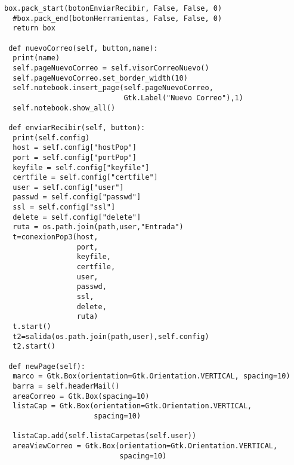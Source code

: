 \begin{lstlisting}[frame=single]
  box.pack_start(botonEnviarRecibir, False, False, 0)
  #box.pack_end(botonHerramientas, False, False, 0)
  return box

 def nuevoCorreo(self, button,name):
  print(name)
  self.pageNuevoCorreo = self.visorCorreoNuevo()
  self.pageNuevoCorreo.set_border_width(10)
  self.notebook.insert_page(self.pageNuevoCorreo, 
                            Gtk.Label("Nuevo Correo"),1)
  self.notebook.show_all()

 def enviarRecibir(self, button):
  print(self.config)
  host = self.config["hostPop"]
  port = self.config["portPop"]
  keyfile = self.config["keyfile"]
  certfile = self.config["certfile"]
  user = self.config["user"]
  passwd = self.config["passwd"]
  ssl = self.config["ssl"]
  delete = self.config["delete"]
  ruta = os.path.join(path,user,"Entrada")
  t=conexionPop3(host, 
                 port, 
                 keyfile, 
                 certfile, 
                 user, 
                 passwd, 
                 ssl, 
                 delete, 
                 ruta)
  t.start()
  t2=salida(os.path.join(path,user),self.config)
  t2.start()

 def newPage(self):
  marco = Gtk.Box(orientation=Gtk.Orientation.VERTICAL, spacing=10)
  barra = self.headerMail()
  areaCorreo = Gtk.Box(spacing=10)
  listaCap = Gtk.Box(orientation=Gtk.Orientation.VERTICAL, 
                     spacing=10)
                    
  listaCap.add(self.listaCarpetas(self.user))
  areaViewCorreo = Gtk.Box(orientation=Gtk.Orientation.VERTICAL, 
                           spacing=10)
\end{lstlisting}
